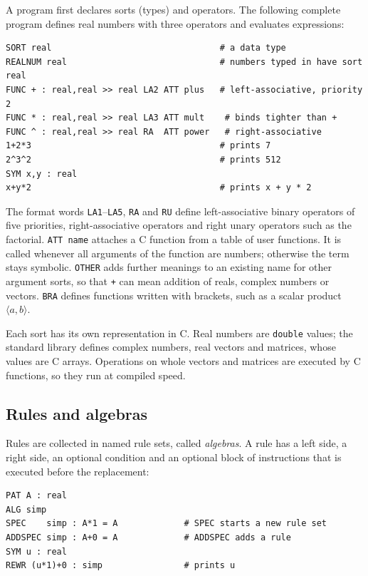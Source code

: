 \documentclass[11pt,a4paper]{article}
\begin{document}
A program first declares sorts (types) and operators. The following
complete program defines real numbers with three operators and evaluates
expressions:

\begin{lstlisting}
SORT real                                 # a data type
REALNUM real                              # numbers typed in have sort real
FUNC + : real,real >> real LA2 ATT plus   # left-associative, priority 2
FUNC * : real,real >> real LA3 ATT mult    # binds tighter than +
FUNC ^ : real,real >> real RA  ATT power   # right-associative
1+2*3                                     # prints 7
2^3^2                                     # prints 512
SYM x,y : real
x+y*2                                     # prints x + y * 2
\end{lstlisting}

The format words \texttt{LA1}--\texttt{LA5}, \texttt{RA} and \texttt{RU}
define left-associative binary operators of five priorities,
right-associative operators and right unary operators such as the
factorial. \texttt{ATT name} attaches a C function from a table of user
functions. It is called whenever all arguments of the function are numbers;
otherwise the term stays symbolic. \texttt{OTHER} adds further meanings to
an existing name for other argument sorts, so that \texttt{+} can mean
addition of reals, complex numbers or vectors. \texttt{BRA} defines
functions written with brackets, such as a scalar product
$\langle a,b\rangle$.

Each sort has its own representation in C. Real numbers are
\texttt{double} values; the standard library defines complex numbers, real
vectors and matrices, whose values are C arrays. Operations on whole
vectors and matrices are executed by C functions, so they run at compiled
speed.

\subsection{Rules and algebras}
\label{sec:rules}

Rules are collected in named rule sets, called \emph{algebras}. A rule has
a left side, a right side, an optional condition and an optional block of
instructions that is executed before the replacement:

\begin{lstlisting}
PAT A : real
ALG simp
SPEC    simp : A*1 = A             # SPEC starts a new rule set
ADDSPEC simp : A+0 = A             # ADDSPEC adds a rule
SYM u : real
REWR (u*1)+0 : simp                # prints u
\end{lstlisting}
\end{document}

